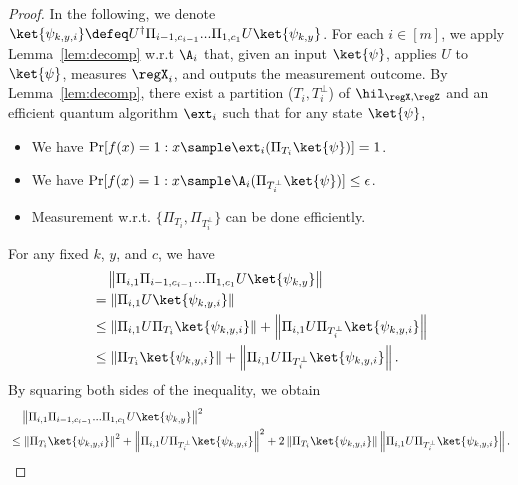 \begin{proof}
In the following, we denote $\ket{\psi_{k,y,i}}\defeq U^{\dagger}\Pi_{i-1,c_{i-1}}...\Pi_{1,c_1}U\ket{\psi_{k,y}}$.
For each $i\in [m]$, we apply Lemma~\ref{lem:decomp} w.r.t $\A_i$ 
that, given an input $\ket{\psi}$, applies $U$ to $\ket{\psi}$, measures $\regX_i$, and outputs the measurement outcome. 
By Lemma~\ref{lem:decomp}, there exist a partition ($T_i,T_i^{\bot}$) of $\hil_{\regX,\regZ}$ and an efficient quantum algorithm $\ext_i$ such that for any state $\ket{\psi}$, 
\begin{itemize} 
  \item
    We have $\Pr[f(x)=1: x\sample \ext_i(\Pi_{T_i}\ket{\psi})]=1$.
    \item We have $\Pr[f(x)=1:x\sample \A_i(\Pi_{T_i^{\bot}}\ket{\psi})]\leq \epsilon$.
    \item Measurement w.r.t. $\{\Pi_{T_i}, \Pi_{T_i^{\bot}}\}$ can be done efficiently.
\end{itemize}
For any fixed $k$, $y$, and $c$, we have
\begin{align*}
    &~~~\left\|\Pi_{i,1}\Pi_{i-1,c_{i-1}}...\Pi_{1,c_1}U\ket{\psi_{k,y}}\right\|\\
    &=\left\|\Pi_{i,1}U\ket{\psi_{k,y,i}}\right\|\\
    &\leq \left\|\Pi_{i,1}U\Pi_{T_i}\ket{\psi_{k,y,i}}\right\|+\left\|\Pi_{i,1}U\Pi_{T_i^\bot}\ket{\psi_{k,y,i}}\right\|\\
    &\leq  \left\|\Pi_{T_i}\ket{\psi_{k,y,i}}\right\|+\left\|\Pi_{i,1}U\Pi_{T_i^\bot}\ket{\psi_{k,y,i}}\right\|.
\end{align*}
By squaring both sides of the inequality, we obtain
\begin{align*}
    &~~~\left\|\Pi_{i,1}\Pi_{i-1,c_{i-1}}...\Pi_{1,c_1}U\ket{\psi_{k,y}}\right\|^2\\
    &\leq  \left\|\Pi_{T_i}\ket{\psi_{k,y,i}}\right\|^2+\left\|\Pi_{i,1}U\Pi_{T_i^\bot}\ket{\psi_{k,y,i}}\right\|^2+2\left\|\Pi_{T_i}\ket{\psi_{k,y,i}}\right\|\left\|\Pi_{i,1}U\Pi_{T_i^\bot}\ket{\psi_{k,y,i}}\right\|.
\end{align*}


\end{proof}

